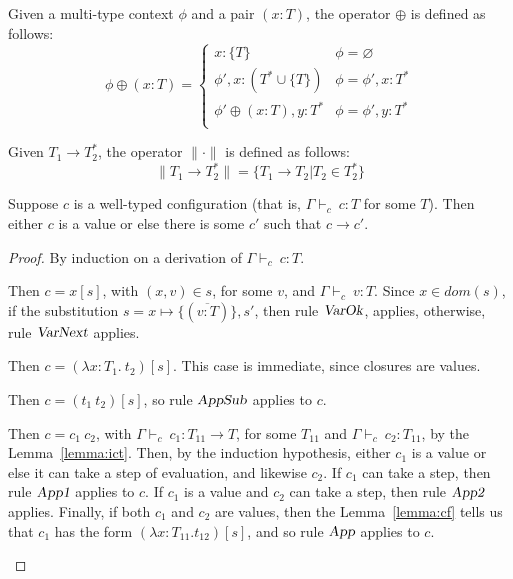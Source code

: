 \documentclass[preprint,authoryear,sort&compress,9pt,nocopyrightspace]{article}
\newcommand{\tto}{\longrightarrow}
\newcommand{\conf}[2][s]{(#2)[#1]}
\newcommand{\Subx}{x \mapsto \{(\overline{v:T})\},s'}
\newcommand{\tyC}{{\Gamma \vdash_c \ }}
\newcommand{\absD}{\lambda x:T_1. \ t_2}
\newcommand{\mtD}{T^{*}}
\newcommand{\mtP}[1]{#1^{*}}
\newcommand{\mtCu}[1]{\{ #1 \}}
\newcommand{\emt}{\phi}
\providecommand{\norm}[1]{\lVert#1\rVert}
\begin{document}
\begin{definition}[$\oplus$]
\label{definition:tcs}
\mbox{}
Given a multi-type context $\emt$ and a pair $(x:T)$, the operator $\oplus$ is defined  as follows:
\[ \emt \oplus (x:T) = \begin{cases} 
      x:\mtCu{T}& \emt =  \varnothing \\
      \emt',x:(\mtD \cup \mtCu{T}) & \emt = \emt',x:\mtD\\
      \emt' \oplus (x:T),y:\mtD & \emt = \emt',y:\mtD\\
   \end{cases}
\]
\end{definition}

\begin{definition}[$\norm{\cdotp}$]
\label{definition:tcs}
\mbox{}
Given $T_1 \to \mtP{T_2}$, the operator $\norm{\cdotp}$ is defined  as follows:
\[ \norm{T_1 \to \mtP{T_2}} = \{T_1 \to T_2|T_2 \in \mtP{T_2}\}
\]
\end{definition}

\begin{theorem}[Progress]
\label{theorem:progress}
\mbox{}
Suppose $c$ is a well-typed configuration (that is, $ \tyC c : T$ for some $T$). Then either $c$ is a value or else there is some $c'$ such that $c \tto c'$.
\end{theorem}

\begin{proof} By induction on a derivation of $\tyC c : T$.
\begin{case}[TCVar]
Then $c = x[s]$, with $(x,v) \in s$, for some $v$,  and $\tyC v:T$. Since $x \in dom(s)$, if the substitution $s = \Subx$, then rule $\textsl {VarOk}$, applies, otherwise, rule $\textsl {VarNext}$ applies.
\end{case}

\begin{case}[TCAbs]
 Then $c = \conf{\absD}$. This case is immediate, since closures are values.
\end{case}

\begin{case}[TCApp] 
 Then $c = \conf{t_1 \ t_2}$, so rule $\textsl {AppSub}$ applies to $c$.
\end{case}

\begin{case}[TCCApp]
 Then $c = c_1 \ c_2$, with $\tyC c_1 : T_{11} \to T$, for some $T_{11}$ and $\tyC c_2 : T_{11}$, by the Lemma~\ref{lemma:ict}. Then, by the induction hypothesis, either $c_1$ is a value or else it can take a step of evaluation, and likewise $c_2$. If $c_1$ can take a step, then rule $\textsl {App1}$ applies to $c$. If $c_1$ is a value and $c_2$ can take a step, then rule $\textsl {App2}$ applies. Finally, if both $c_1$ and $c_2$ are values, then the Lemma~\ref{lemma:cf} tells us that $c_1$ has the form $\conf{\lambda x: T_{11}.t_{12}}$, and so rule $\textsl {App}$ applies to $c$.
\end{case}
\end{proof}
\end{document}
